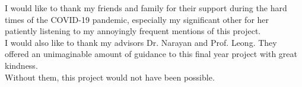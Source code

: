 \documentclass[fyp]{socreport}
\begin{document}
\begin{acknowledgement}
I would like to thank my friends and family for their support during the hard times of the COVID-19 pandemic, especially my significant other for her patiently listening to my annoyingly frequent mentions of this project.\\
I would also like to thank my advisors Dr. Narayan and Prof. Leong. They offered an unimaginable amount of guidance to this final year project with great kindness.\\
Without them, this project would not have been possible.\\
\end{acknowledgement}

\listoffigures 
\listoftables
\tableofcontents










\appendix





\end{document}
